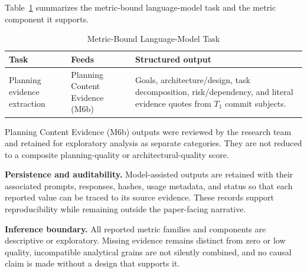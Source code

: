 Table~\ref{tab:llm_prompt_catalog} summarizes the metric-bound language-model
task and the metric component it supports.

\begin{table}[t]
\caption{Metric-Bound Language-Model Task}
\label{tab:llm_prompt_catalog}
\centering
\small
\begin{tabular}{@{}>{\raggedright\arraybackslash}p{1.7cm}>{\raggedright\arraybackslash}p{1.7cm}>{\raggedright\arraybackslash}p{3.7cm}@{}}
\toprule
\textbf{Task} & \textbf{Feeds} & \textbf{Structured output} \\
\midrule
Planning evidence extraction & Planning Content Evidence (M6b) & Goals, architecture/design, task decomposition, risk/dependency, and literal evidence quotes from $T_1$ commit subjects. \\
\bottomrule
\end{tabular}
\end{table}

Planning Content Evidence (M6b) outputs were reviewed by the research team and retained for exploratory
analysis as separate categories. They are not reduced to a composite
planning-quality or architectural-quality score.

\textbf{Persistence and auditability.} Model-assisted outputs are retained with
their associated prompts, responses, hashes, usage metadata, and status so that
each reported value can be traced to its source evidence. These records support
reproducibility while remaining outside the paper-facing narrative.

\textbf{Inference boundary.} All reported metric families and components are
descriptive or exploratory. Missing evidence remains distinct from zero or
low quality, incompatible analytical grains are not silently combined, and no
causal claim is made without a design that supports it.
